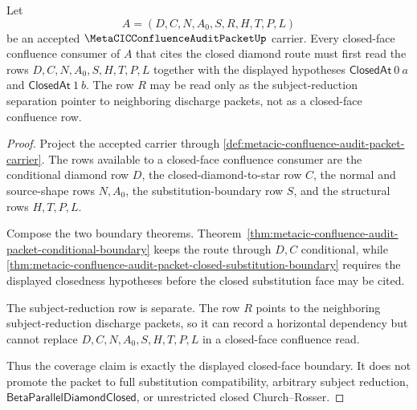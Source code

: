 \begin{theorem}
\label{thm:metacic-confluence-audit-closed-face-coverage}
Let
$$
A=(D,C,N,A_0,S,R,H,T,P,L)
$$
be an accepted $\MetaCICConfluenceAuditPacketUp$ carrier. Every closed-face confluence consumer of $A$ that cites the closed diamond route must first read the rows $D,C,N,A_0,S,H,T,P,L$ together with the displayed hypotheses $\mathsf{ClosedAt}\ 0\ a$ and $\mathsf{ClosedAt}\ 1\ b$. The row $R$ may be read only as the subject-reduction separation pointer to neighboring discharge packets, not as a closed-face confluence row.
\end{theorem}
\begin{proof}
Project the accepted carrier through \autoref{def:metacic-confluence-audit-packet-carrier}. The rows available to a closed-face confluence consumer are the conditional diamond row $D$, the closed-diamond-to-star row $C$, the normal and source-shape rows $N,A_0$, the substitution-boundary row $S$, and the structural rows $H,T,P,L$.

Compose the two boundary theorems. Theorem~\ref{thm:metacic-confluence-audit-packet-conditional-boundary} keeps the route through $D,C$ conditional, while \autoref{thm:metacic-confluence-audit-packet-closed-substitution-boundary} requires the displayed closedness hypotheses before the closed substitution face may be cited.

The subject-reduction row is separate. The row $R$ points to the neighboring subject-reduction discharge packets, so it can record a horizontal dependency but cannot replace $D,C,N,A_0,S,H,T,P,L$ in a closed-face confluence read.

Thus the coverage claim is exactly the displayed closed-face boundary. It does not promote the packet to full substitution compatibility, arbitrary subject reduction, $\mathsf{BetaParallelDiamondClosed}$, or unrestricted closed Church--Rosser.
\end{proof}

